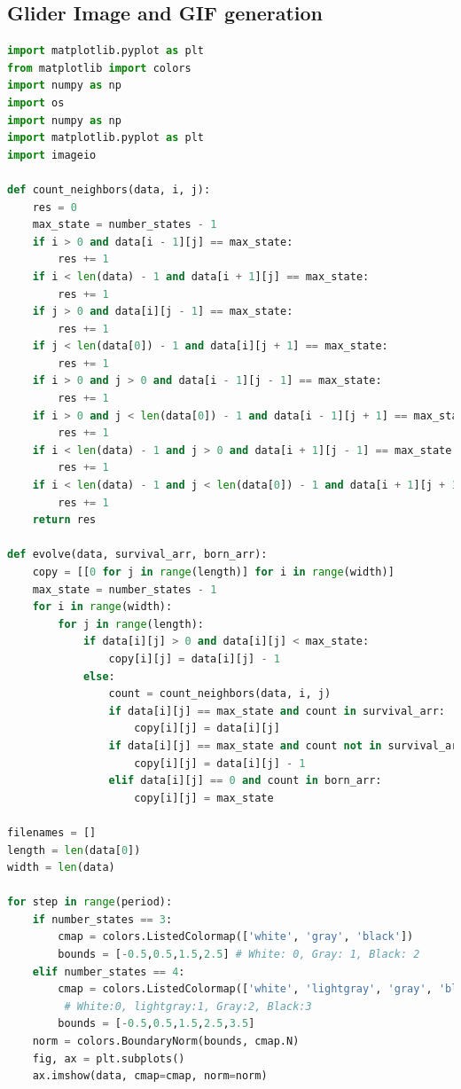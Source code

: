 \documentclass[12pt]{article}
\numberwithin{figure}{section} %
\begin{document}
\subsection{Glider Image and GIF generation}
\label{subsection:Glider Image and GIF generation}
\begin{lstlisting}[language = Python]
import matplotlib.pyplot as plt
from matplotlib import colors
import numpy as np
import os
import numpy as np
import matplotlib.pyplot as plt
import imageio

def count_neighbors(data, i, j):
    res = 0
    max_state = number_states - 1
    if i > 0 and data[i - 1][j] == max_state:
        res += 1
    if i < len(data) - 1 and data[i + 1][j] == max_state:
        res += 1
    if j > 0 and data[i][j - 1] == max_state:
        res += 1
    if j < len(data[0]) - 1 and data[i][j + 1] == max_state:
        res += 1
    if i > 0 and j > 0 and data[i - 1][j - 1] == max_state: 
        res += 1
    if i > 0 and j < len(data[0]) - 1 and data[i - 1][j + 1] == max_state:
        res += 1
    if i < len(data) - 1 and j > 0 and data[i + 1][j - 1] == max_state:
        res += 1
    if i < len(data) - 1 and j < len(data[0]) - 1 and data[i + 1][j + 1] == max_state:
        res += 1
    return res

def evolve(data, survival_arr, born_arr): 
    copy = [[0 for j in range(length)] for i in range(width)]
    max_state = number_states - 1
    for i in range(width):
        for j in range(length):
            if data[i][j] > 0 and data[i][j] < max_state: 
                copy[i][j] = data[i][j] - 1
            else: 
                count = count_neighbors(data, i, j)
                if data[i][j] == max_state and count in survival_arr: 
                    copy[i][j] = data[i][j]
                if data[i][j] == max_state and count not in survival_arr: 
                    copy[i][j] = data[i][j] - 1
                elif data[i][j] == 0 and count in born_arr:
                    copy[i][j] = max_state

filenames = []
length = len(data[0])
width = len(data)

for step in range(period): 
    if number_states == 3: 
        cmap = colors.ListedColormap(['white', 'gray', 'black'])
        bounds = [-0.5,0.5,1.5,2.5] # White: 0, Gray: 1, Black: 2
    elif number_states == 4: 
        cmap = colors.ListedColormap(['white', 'lightgray', 'gray', 'black'])
	     # White:0, lightgray:1, Gray:2, Black:3
        bounds = [-0.5,0.5,1.5,2.5,3.5] 
    norm = colors.BoundaryNorm(bounds, cmap.N)
    fig, ax = plt.subplots()
    ax.imshow(data, cmap=cmap, norm=norm)


\end{lstlisting}
\end{document}
